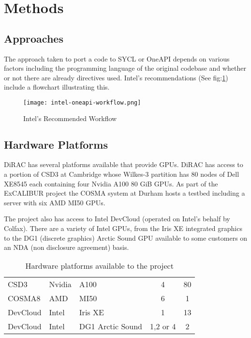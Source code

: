 \documentclass[main]{subfiles}
\begin{document}
\section{Methods}\label{sec:methods}
\subsection{Approaches}\label{sec:approaches}

The approach taken to port a code to SYCL or OneAPI\cite{intel_corp_oneapi_nodate} depends on various factors including the programming language of the original codebase and whether or not there are already directives used.
Intel's recommendations (See fig:\ref{fig:intel-workflow}) include a flowchart illustrating this.

\begin{figure}[htb]
	\caption{Intel's Recommended Workflow}
	\texttt{[image: intel-oneapi-workflow.png]}
	\label{fig:intel-workflow} %
\end{figure}

\subsection{Hardware Platforms}

DiRAC has several platforms available that provide GPUs.
DiRAC has access to a portion of CSD3 at Cambridge whose Wilkes-3 partition has 80 nodes of Dell XE8545 each containing four Nvidia A100 80 GiB GPUs.
As part of the ExCALIBUR project the COSMA system at Durham hosts a testbed including a server with six AMD MI50 GPUs.

The project also has access to Intel DevCloud (operated on Intel's behalf by Colfax).
There are a variety of Intel GPUs, from the Iris XE integrated graphics to the DG1 (discrete graphics) Arctic Sound GPU available to some customers on an NDA (non disclosure agreement) basis.

\begin{table}[!htbp]
	\begin{tabular}{@{}lllcS@{}}
		\toprule
		 &  &  &  & {} \\
		\midrule
		CSD3            & Nvidia         & A100              & 4                 & 80                  \\
		COSMA8          & AMD            & MI50              & 6                 & 1                   \\
		DevCloud        & Intel          & Iris XE           & 1                 & 13                  \\
		DevCloud        & Intel          & DG1 Arctic Sound  & 1,2 or 4          & 2                   \\
		\bottomrule
	\end{tabular}
	\caption{Hardware platforms available to the project}
	\label{tab:GPUs} %
\end{table}
\end{document}
